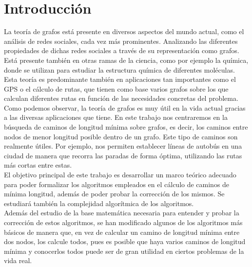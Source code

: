 %


\chapter{Introducción}

La teoría de grafos está presente en diversos aspectos del mundo actual, como el análisis de redes sociales, cada vez más prominentes. Analizando las diferentes propiedades de dichas redes sociales a través de su representación como grafos. Está presente también en otras ramas de la ciencia, como por ejemplo la química, donde se utilizan para estudiar la estructura química de diferentes moléculas. \\

Esta teoría es predominante también en aplicaciones tan importantes como el GPS o el cálculo de rutas, que tienen como base varios grafos sobre los que calculan diferentes rutas en función de las necesidades concretas del problema. \\

Como podemos observar, la teoría de grafos es muy útil en la vida actual gracias a las diversas aplicaciones que tiene. En este trabajo nos centraremos en la búsqueda de caminos de longitud mínima sobre grafos, es decir, los caminos entre nodos de menor longitud posible dentro de un grafo. Este tipo de caminos son realmente útiles. Por ejemplo, nos permiten establecer líneas de autobús en una ciudad de manera que recorra las paradas de forma óptima, utilizando las rutas más cortas entre estas. \\

El objetivo principal de este trabajo es desarrollar un marco teórico adecuado para poder formalizar los algoritmos empleados en el cálculo de caminos de mínima longitud, además de poder probar la corrección de los mismos. Se estudiará también la complejidad algorítmica de los algoritmos. \\

Además del estudio de la base matemática necesaria para entender y probar la corrección de estos algoritmos, se han modificado algunos de los algoritmos más básicos de manera que, en vez de calcular un camino de longitud mínima entre dos nodos, los calcule todos, pues es posible que haya varios caminos de longitud mínima y conocerlos todos puede ser de gran utilidad en ciertos problemas de la vida real. \\

